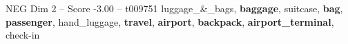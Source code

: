 \begin{textsample}{NEG Dim 2 – Score -3.00 – t009751}  \label{ex:f2_neg_037}
luggage\_\&\_bags, \textbf{baggage}, suitcase, \textbf{bag}, \textbf{passenger}, hand\_luggage, \textbf{travel}, \textbf{airport}, \textbf{backpack}, \textbf{airport\_terminal}, check-in

\end{textsample}
